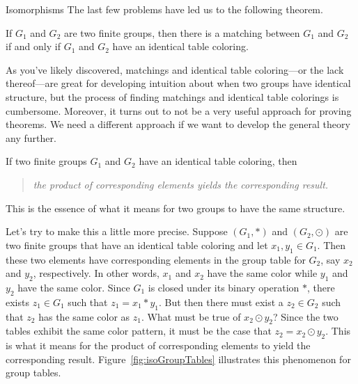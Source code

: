\begin{section}{Isomorphisms}
The last few problems have led us to the following theorem.

\begin{theorem}
If $G_1$ and $G_2$ are two finite groups, then there is a matching between $G_1$ and $G_2$ if and only if $G_1$ and $G_2$ have an identical table coloring.
\end{theorem}

As you've likely discovered, matchings and identical table coloring---or the lack thereof---are great for developing intuition about when two groups have identical structure, but the process of finding matchings and identical table colorings is cumbersome.  Moreover, it turns out to not be a very useful approach for proving theorems.  We need a different approach if we want to develop the general theory any further. 

If two finite groups $G_1$ and $G_2$ have an identical table coloring, then
\begin{quotation}
\emph{the product of corresponding elements yields the corresponding result.}
\end{quotation}
This is the essence of what it means for two groups to have the same structure.  

Let's try to make this a little more precise.  Suppose $(G_1,*)$ and $(G_2,\odot)$ are two finite groups that have an identical table coloring and let $x_1,y_1\in G_1$.  Then these two elements have corresponding elements in the group table for $G_2$, say $x_2$ and $y_2$, respectively.  In other words, $x_1$ and $x_2$ have the same color while $y_1$ and $y_2$ have the same color.  Since $G_1$ is closed under its binary operation $*$, there exists $z_1\in G_1$ such that $z_1=x_1*y_1$.  But then there must exist a $z_2\in G_2$ such that $z_2$ has the same color as $z_1$.  What must be true of $x_2\odot y_2$?  Since the two tables exhibit the same color pattern, it must be the case that $z_2=x_2\odot y_2$.  This is what it means for the product of corresponding elements to yield the corresponding result.  Figure~\ref{fig:isoGroupTables} illustrates this phenomenon for group tables.


\end{section}
